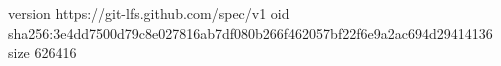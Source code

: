 version https://git-lfs.github.com/spec/v1
oid sha256:3e4dd7500d79c8e027816ab7df080b266f462057bf22f6e9a2ac694d29414136
size 626416
